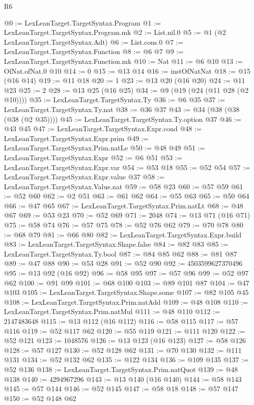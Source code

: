 \begin{lexlean}{R6}
\begin{coremodule}
@0 := LexLeanTarget.TargetSyntax.Program
@1 := LexLeanTarget.TargetSyntax.Program.mk
@2 := List.nil.{0}
@5 := @1 (@2 LexLeanTarget.TargetSyntax.Adt)
@6 := List.cons.{0}
@7 := LexLeanTarget.TargetSyntax.Function
@8 := @6 @7
@9 := LexLeanTarget.TargetSyntax.Function.mk
@10 := Nat
@11 := @6 @10
@13 := OfNat.ofNat.{0} @10
@14 := 0
@15 := @13 @14
@16 := instOfNatNat
@18 := @15 (@16 @14)
@19 := @11 @18
@20 := 1
@23 := @13 @20 (@16 @20)
@24 := @11 @23
@25 := 2
@28 := @13 @25 (@16 @25)
@34 := @9 (@19 (@24 (@11 @28 (@2 @10))))
@35 := LexLeanTarget.TargetSyntax.Ty
@36 := @6 @35
@37 := LexLeanTarget.TargetSyntax.Ty.nat
@38 := @36 @37
@43 := @34 (@38 (@38 (@38 (@2 @35))))
@45 := LexLeanTarget.TargetSyntax.Ty.option @37
@46 := @43 @45
@47 := LexLeanTarget.TargetSyntax.Expr.cond
@48 := LexLeanTarget.TargetSyntax.Expr.prim
@49 := LexLeanTarget.TargetSyntax.Prim.natLe
@50 := @48 @49
@51 := LexLeanTarget.TargetSyntax.Expr
@52 := @6 @51
@53 := LexLeanTarget.TargetSyntax.Expr.var
@54 := @53 @18
@55 := @52 @54
@57 := LexLeanTarget.TargetSyntax.Expr.value @37
@58 := LexLeanTarget.TargetSyntax.Value.nat
@59 := @58 @23
@60 := @57 @59
@61 := @52 @60
@62 := @2 @51
@63 := @61 @62
@64 := @55 @63
@65 := @50 @64
@66 := @47 @65
@67 := LexLeanTarget.TargetSyntax.Prim.natLt
@68 := @48 @67
@69 := @53 @23
@70 := @52 @69
@71 := 2048
@74 := @13 @71 (@16 @71)
@75 := @58 @74
@76 := @57 @75
@78 := @52 @76 @62
@79 := @70 @78
@80 := @68 @79
@81 := @66 @80
@82 := LexLeanTarget.TargetSyntax.Expr.build
@83 := LexLeanTarget.TargetSyntax.Shape.false
@84 := @82 @83
@85 := LexLeanTarget.TargetSyntax.Ty.bool
@87 := @84 @85 @62
@88 := @81 @87
@89 := @47 @88
@90 := @53 @28
@91 := @52 @90
@92 := 4503599627370496
@95 := @13 @92 (@16 @92)
@96 := @58 @95
@97 := @57 @96
@99 := @52 @97 @62
@100 := @91 @99
@101 := @68 @100
@103 := @89 @101 @87
@104 := @47 @103
@105 := LexLeanTarget.TargetSyntax.Shape.some
@107 := @82 @105 @45
@108 := LexLeanTarget.TargetSyntax.Prim.natAdd
@109 := @48 @108
@110 := LexLeanTarget.TargetSyntax.Prim.natMul
@111 := @48 @110
@112 := 2147483648
@115 := @13 @112 (@16 @112)
@116 := @58 @115
@117 := @57 @116
@119 := @52 @117 @62
@120 := @55 @119
@121 := @111 @120
@122 := @52 @121
@123 := 1048576
@126 := @13 @123 (@16 @123)
@127 := @58 @126
@128 := @57 @127
@130 := @52 @128 @62
@131 := @70 @130
@132 := @111 @131
@134 := @52 @132 @62
@135 := @122 @134
@136 := @109 @135
@137 := @52 @136
@138 := LexLeanTarget.TargetSyntax.Prim.natQuot
@139 := @48 @138
@140 := 4294967296
@143 := @13 @140 (@16 @140)
@144 := @58 @143
@145 := @57 @144
@146 := @52 @145
@147 := @58 @18
@148 := @57 @147
@150 := @52 @148 @62

\end{coremodule}
\end{lexlean}
